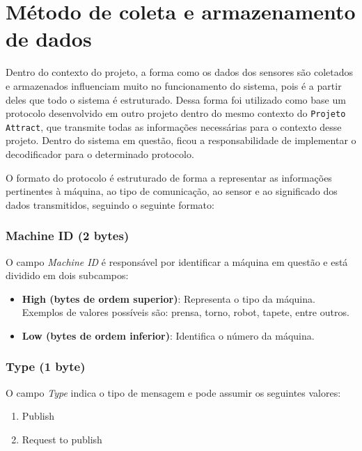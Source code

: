 \section[Método de coleta e armazenamento de dados]{Método de coleta e armazenamento de dados}

Dentro do contexto do projeto, a forma como os dados dos sensores são coletados e armazenados influenciam muito no funcionamento do sistema, pois é a partir deles que todo o sistema é estruturado. Dessa forma foi utilizado como base um protocolo desenvolvido em outro projeto dentro do mesmo contexto do \texttt{Projeto Attract}, que transmite todas as informações necessárias para o contexto desse projeto. Dentro do sistema em questão, ficou a responsabilidade de implementar o decodificador para o determinado protocolo.

O formato do protocolo é estruturado de forma a representar as informações pertinentes à máquina, ao tipo de comunicação, ao sensor e ao significado dos dados transmitidos, seguindo o seguinte formato:

\subsubsection{Machine ID (2 bytes)}

O campo \textit{Machine ID} é responsável por identificar a máquina em questão e está dividido em dois subcampos:

\begin{itemize}
    \item \textbf{High (bytes de ordem superior)}: Representa o tipo da máquina. Exemplos de valores possíveis são: prensa, torno, robot, tapete, entre outros.
    \item \textbf{Low (bytes de ordem inferior)}: Identifica o número da máquina.
\end{itemize}

\subsubsection{Type (1 byte)}

O campo \textit{Type} indica o tipo de mensagem e pode assumir os seguintes valores:
\begin{enumerate}
    \item Publish
    \item Request to publish
\end{enumerate}

